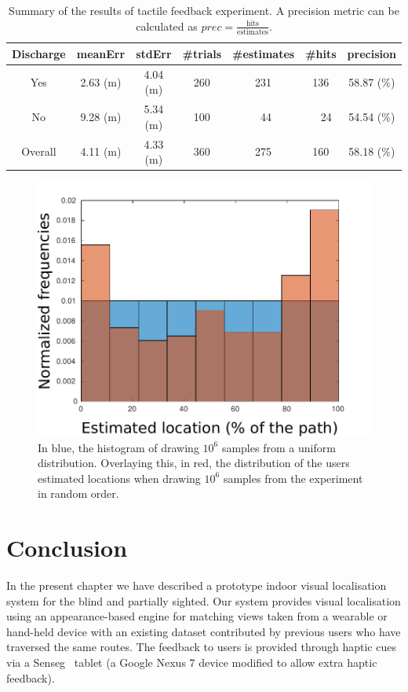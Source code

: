 \begin{table}
\centering
    \caption {Summary of the results of tactile feedback experiment. A precision metric can be calculated as $prec = \frac{\text{hits}}{\text{estimates}}$. }

    \begin{tabular}{ccccccc}
    \hline
     Discharge & meanErr & stdErr  & \#trials & \#estimates & \#hits & precision \\ \hline 
    Yes 			      &  2.63 (m)        & 4.04 (m)   & 260    & 231       & 136 & 58.87 (\%)     \\ \hline
    No  				  &  9.28 (m)      & 5.34 (m)  & 100    & ~44        & ~~24   & 54.54 (\%)    \\ \hline
	Overall &   4.11 (m)   & 4.33 (m) & 360 & 275 & 160 & 58.18 (\%)  \\ \hline
    \end{tabular}
\label{tab:sensegSummaries}
\end{table}


\begin{figure}[h]
    \centering
    \includegraphics[width=.7\textwidth]{gfx/Chapter06/barplot_rand.pdf}%
    \caption{In blue, the histogram of drawing $10^6$ samples from a uniform distribution. Overlaying this, in red, the distribution of the users estimated locations when drawing $10^6$ samples from the experiment in random order.}   
\end{figure}


\section{Conclusion}
\label{sec:conclusion}


In the present chapter we have described a prototype indoor visual localisation system for the blind and partially sighted. Our system provides visual localisation using an appearance-based engine for matching views taken from a wearable or hand-held device with an existing dataset contributed by previous users who have traversed the same routes. The feedback to users is provided through haptic cues via a Senseg\texttrademark~ tablet (a Google Nexus 7 device modified to allow extra haptic feedback).


